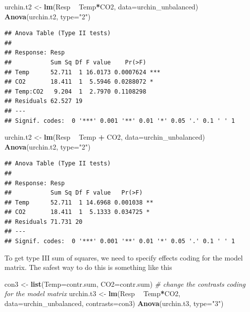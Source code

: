 \documentclass[]{book}
\newenvironment{Shaded}{\begin{snugshade}}{\end{snugshade}}
\newcommand{\KeywordTok}[1]{\textcolor[rgb]{0.13,0.29,0.53}{\textbf{#1}}}
\newcommand{\DataTypeTok}[1]{\textcolor[rgb]{0.13,0.29,0.53}{#1}}
\newcommand{\StringTok}[1]{\textcolor[rgb]{0.31,0.60,0.02}{#1}}
\newcommand{\CommentTok}[1]{\textcolor[rgb]{0.56,0.35,0.01}{\textit{#1}}}
\newcommand{\OperatorTok}[1]{\textcolor[rgb]{0.81,0.36,0.00}{\textbf{#1}}}
\newcommand{\NormalTok}[1]{#1}
\begin{document}
\begin{Shaded}
\begin{Highlighting}[]
\NormalTok{urchin.t2 <-}\StringTok{ }\KeywordTok{lm}\NormalTok{(Resp }\OperatorTok{~}\StringTok{ }\NormalTok{Temp}\OperatorTok{*}\NormalTok{CO2, }\DataTypeTok{data=}\NormalTok{urchin_unbalanced)}
\KeywordTok{Anova}\NormalTok{(urchin.t2, }\DataTypeTok{type=}\StringTok{"2"}\NormalTok{)}
\end{Highlighting}
\end{Shaded}

\begin{verbatim}
## Anova Table (Type II tests)
## 
## Response: Resp
##           Sum Sq Df F value    Pr(>F)    
## Temp      52.711  1 16.0173 0.0007624 ***
## CO2       18.411  1  5.5946 0.0288072 *  
## Temp:CO2   9.204  1  2.7970 0.1108298    
## Residuals 62.527 19                      
## ---
## Signif. codes:  0 '***' 0.001 '**' 0.01 '*' 0.05 '.' 0.1 ' ' 1
\end{verbatim}

\begin{Shaded}
\begin{Highlighting}[]
\NormalTok{urchin.t2 <-}\StringTok{ }\KeywordTok{lm}\NormalTok{(Resp }\OperatorTok{~}\StringTok{ }\NormalTok{Temp }\OperatorTok{+}\StringTok{ }\NormalTok{CO2, }\DataTypeTok{data=}\NormalTok{urchin_unbalanced)}
\KeywordTok{Anova}\NormalTok{(urchin.t2, }\DataTypeTok{type=}\StringTok{"2"}\NormalTok{)}
\end{Highlighting}
\end{Shaded}

\begin{verbatim}
## Anova Table (Type II tests)
## 
## Response: Resp
##           Sum Sq Df F value   Pr(>F)   
## Temp      52.711  1 14.6968 0.001038 **
## CO2       18.411  1  5.1333 0.034725 * 
## Residuals 71.731 20                    
## ---
## Signif. codes:  0 '***' 0.001 '**' 0.01 '*' 0.05 '.' 0.1 ' ' 1
\end{verbatim}

To get type III sum of squares, we need to specify effects coding for
the model matrix. The safest way to do this is something like this

\begin{Shaded}
\begin{Highlighting}[]
\NormalTok{con3 <-}\StringTok{ }\KeywordTok{list}\NormalTok{(}\DataTypeTok{Temp=}\NormalTok{contr.sum, }\DataTypeTok{CO2=}\NormalTok{contr.sum) }\CommentTok{# change the contrasts coding for the model matrix}
\NormalTok{urchin.t3 <-}\StringTok{ }\KeywordTok{lm}\NormalTok{(Resp }\OperatorTok{~}\StringTok{ }\NormalTok{Temp}\OperatorTok{*}\NormalTok{CO2, }\DataTypeTok{data=}\NormalTok{urchin_unbalanced, }\DataTypeTok{contrasts=}\NormalTok{con3)}
\KeywordTok{Anova}\NormalTok{(urchin.t3, }\DataTypeTok{type=}\StringTok{"3"}\NormalTok{)}
\end{Highlighting}
\end{Shaded}
\end{document}
